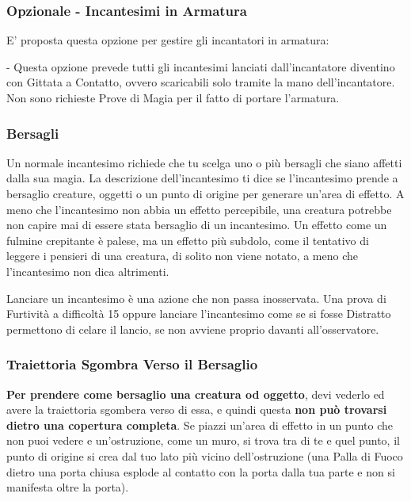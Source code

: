 \begin{multicols}{2}
\subsubsection{Opzionale - Incantesimi in Armatura}

E' proposta questa opzione per gestire gli incantatori in armatura:

- Questa opzione prevede tutti gli incantesimi lanciati dall'incantatore diventino con Gittata a Contatto, ovvero scaricabili solo tramite la mano dell'incantatore. Non sono richieste Prove di Magia per il fatto di portare l'armatura.


\subsubsection{Bersagli}\label{magiebersagli}

Un normale incantesimo richiede che tu scelga uno o più bersagli che siano affetti dalla sua magia. La descrizione dell'incantesimo ti dice se l'incantesimo prende a bersaglio creature, oggetti o un punto di origine per generare un'area di effetto. A meno che l'incantesimo non abbia un effetto percepibile, una creatura potrebbe non capire mai di essere stata bersaglio di un incantesimo. Un effetto come un fulmine crepitante è palese, ma un effetto più subdolo, come il tentativo di leggere i pensieri di una creatura, di solito non viene notato, a meno che l'incantesimo non dica altrimenti.

Lanciare un incantesimo è una azione che non passa inosservata. Una prova di Furtività a difficoltà 15 oppure lanciare l'incantesimo come se si fosse Distratto permettono di celare il lancio, se non avviene proprio davanti all'osservatore.

\subsubsection*{Traiettoria Sgombra Verso il Bersaglio}

\textbf{Per prendere come bersaglio una creatura od oggetto}, devi vederlo ed avere la traiettoria sgombera verso di essa, e quindi questa \textbf{non può trovarsi dietro una copertura completa}. Se piazzi un'area di effetto in un punto che non puoi vedere e un'ostruzione, come un muro, si trova tra di te e quel punto, il punto di origine si crea dal tuo lato più vicino dell'ostruzione (una Palla di Fuoco dietro una porta chiusa esplode al contatto con la porta dalla tua parte e non si manifesta oltre la porta).


\end{multicols}
